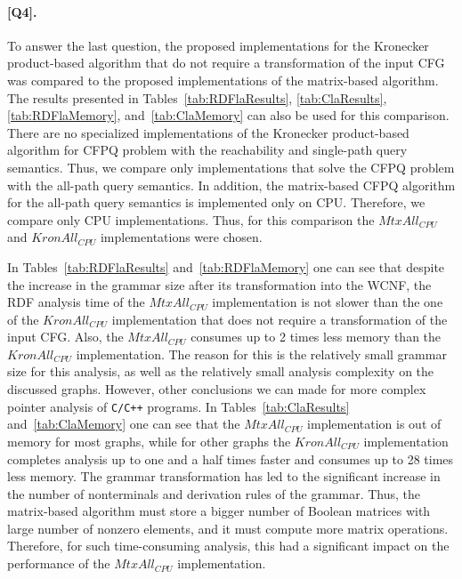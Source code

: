 \paragraph{[Q4].} To answer the last question, the proposed implementations for the Kronecker product-based algorithm that do not require a transformation of the input CFG was compared to the proposed implementations of the matrix-based algorithm. The results presented in Tables~\ref{tab:RDFlaResults}, \ref{tab:ClaResults}, \ref{tab:RDFlaMemory}, and~\ref{tab:ClaMemory} can also be used for this comparison. There are no specialized implementations of the Kronecker product-based algorithm for CFPQ problem with the reachability and single-path query semantics. Thus, we compare only implementations that solve the CFPQ problem with the all-path query semantics. In addition, the matrix-based CFPQ algorithm for the all-path query semantics is implemented only on CPU. Therefore, we compare only CPU implementations. Thus, for this comparison the $\textit{MtxAll}_{\textit{CPU}}$ and $\textit{KronAll}_{\textit{CPU}}$ implementations were chosen.

In Tables~\ref{tab:RDFlaResults} and~\ref{tab:RDFlaMemory} one can see that despite the increase in the grammar size after its transformation into the WCNF, the RDF analysis time of the $\textit{MtxAll}_{\textit{CPU}}$ implementation is not slower than the one of the $\textit{KronAll}_{\textit{CPU}}$ implementation that does not require a transformation of the input CFG. Also, the $\textit{MtxAll}_{\textit{CPU}}$ consumes up to 2 times less memory than the $\textit{KronAll}_{\textit{CPU}}$ implementation. The reason for this is the relatively small grammar size for this analysis, as well as the relatively small analysis complexity on the discussed graphs. However, other conclusions we can made for more complex pointer analysis of \texttt{C/C++} programs. In Tables~\ref{tab:ClaResults} and~\ref{tab:ClaMemory} one can see that the $\textit{MtxAll}_{\textit{CPU}}$ implementation is out of memory for most graphs, while for other graphs the $\textit{KronAll}_{\textit{CPU}}$ implementation completes analysis up to one and a half times faster and consumes up to 28 times less memory. The grammar transformation has led to the significant increase in the number of nonterminals and derivation rules of the grammar. Thus, the matrix-based algorithm must store a bigger number of Boolean matrices with large number of nonzero elements, and it must compute more matrix operations. Therefore, for such time-consuming analysis, this had a significant impact on the performance of the $\textit{MtxAll}_{\textit{CPU}}$ implementation.

